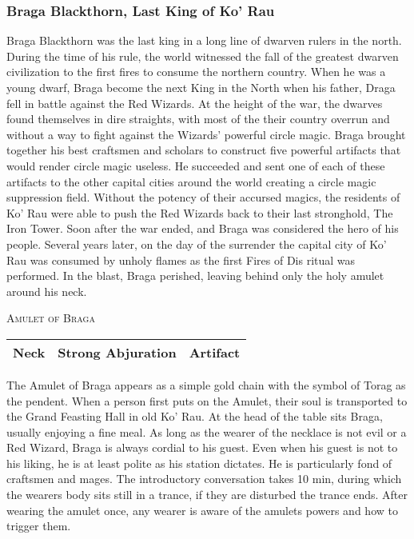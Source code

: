 		\subsubsection{Braga Blackthorn, Last King of Ko' Rau}
			Braga Blackthorn was the last king in a long line of dwarven rulers
			in the north.  During the time of his rule, the world witnessed the 
			fall of the greatest dwarven civilization to the first fires to 
			consume the northern country.  When he was a young dwarf, Braga become 
			the next King in the North when his father, Draga fell in battle 
			against the Red Wizards.  At the height of the war, the dwarves found 
			themselves in dire straights, with most of the their country overrun
			and without a way to fight against the Wizards' powerful circle magic.
			Braga brought together his best craftsmen and scholars to construct 
			five powerful artifacts that would render circle magic useless.  He 
			succeeded and sent one of each of these artifacts to the other capital
			cities around the world creating a circle magic suppression field.  
			Without the potency of their accursed magics, the residents of Ko' Rau
			were able to push the Red Wizards back to their last stronghold, The 
			Iron Tower.  Soon after the war ended, and Braga was considered the
			hero of his people.  Several years later, on the day of the surrender
			the capital city of Ko' Rau was consumed by unholy flames as the 
			first Fires of Dis ritual was performed.  In the blast, Braga perished,
			leaving behind only the holy amulet around his neck.  
			
			\textsc{Amulet of Braga}
			
			\begin{tabular}{| c | c | c |}
				\hline
				Neck & Strong Abjuration & Artifact \\
				\hline
			\end{tabular}
			
			The Amulet of Braga appears as a simple gold chain with the symbol of
			Torag as the pendent.  When a person first puts on the Amulet, their 
			soul is transported to the Grand Feasting Hall in old Ko' Rau.  At 
			the head of the table sits Braga, usually enjoying a fine meal.  As
			long as the wearer of the necklace is not evil or a Red Wizard, Braga
			is always cordial to his guest.  Even when his guest is not to his 
			liking, he is at least polite as his station dictates.  He is 
			particularly fond of craftsmen and mages.  The introductory 
			conversation takes 10 min, during which the wearers body sits still
			in a trance, if they are disturbed the trance ends.  After wearing 
			the amulet once, any wearer is aware of the amulets powers and how  to
			trigger them.  
			
